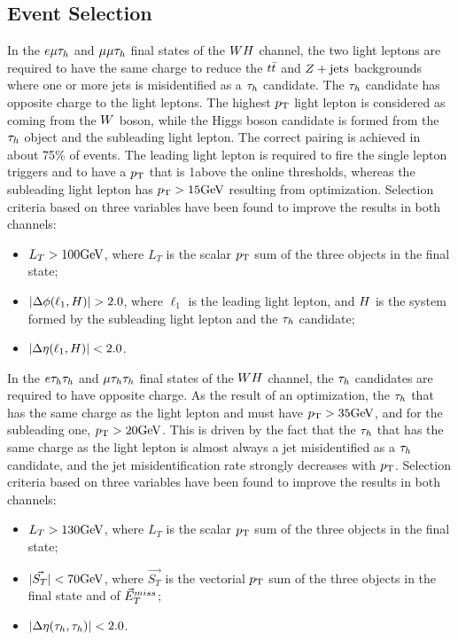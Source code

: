 \subsection{Event Selection}
\label{sec:vh_evt_selection}
In the $e\mu\tau_{h}$ and $\mu\mu\tau_{h}$ final states of the $WH$ channel, 
the two light leptons are required to have the same charge to reduce the $t\bar{t}$ 
and $Z+\textrm{jets}$ backgrounds where one or more jets is misidentified as a $\tau_{h}$ 
candidate. The $\tau_{h}$ candidate has opposite charge to the light leptons. The highest $p_\mathrm{T}$
light lepton is considered as coming from the $W$ boson, while the Higgs boson 
candidate is formed from the $\tau_{h}$ object and the subleading light lepton. The 
correct pairing is achieved in about 75\% of events. The leading light lepton is required 
to fire the single lepton triggers and to have a $p_\mathrm{T}$ that is 1\GeV above the online 
thresholds, whereas the subleading light lepton has $p_\mathrm{T}>15\mathrm{GeV}$ resulting from
optimization. Selection criteria based on three variables have been found to 
improve the results in both channels:
\begin{itemize}
\item $L_T>100\mathrm{GeV}$, where $L_T$ is the scalar $p_\mathrm{T}$ sum of the three objects in the final state;
\item $\lvert\Delta\phi(\ell_1,H)\rvert>2.0$, where $\ell_1$ is the leading light lepton, and 
$H$ is the system formed by the subleading light lepton and the $\tau_{h}$ candidate;
\item $\lvert\Delta\eta(\ell_1,H)\rvert<2.0$.
\end{itemize}


In the $e\tau_{h}\tau_{h}$ and $\mu\tau_{h}\tau_{h}$ final states of the $WH$ channel, 
the $\tau_{h}$ candidates are required to have opposite charge. As the result 
of an optimization, the $\tau_{h}$ that has the same charge as the light lepton and must 
have $p_\mathrm{T} > 35\mathrm{GeV}$, and for the subleading one, $p_\mathrm{T} > 20\mathrm{GeV}$. This is driven 
by the fact that the $\tau_{h}$ that has the same charge as the light lepton is almost 
always a jet misidentified as a $\tau_{h}$ candidate, and the jet misidentification 
rate strongly decreases with $p_\mathrm{T}$. Selection criteria based on three variables 
have been found to improve the results in both channels:
\begin{itemize}
\item $L_T>130\mathrm{GeV}$, where $L_T$ is the scalar $p_\mathrm{T}$ sum of the three objects in the final state;
\item $\lvert\vec{S_T}\rvert<70\mathrm{GeV}$, where $\vec{S_T}$ is the vectorial $p_\mathrm{T}$ sum of the three objects in the final state and of $\vec{E}^{miss}_T$;
\item $\lvert\Delta\eta(\tau_{h},\tau_{h})\rvert<2.0$.
\end{itemize}



